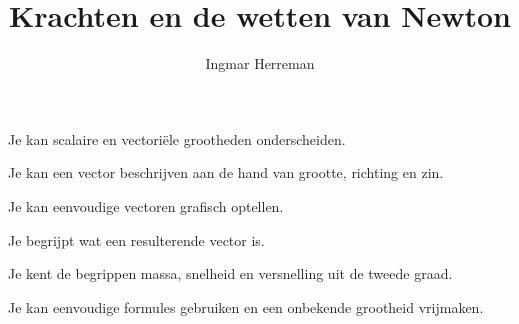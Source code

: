 \documentclass{ximera}
\title{Krachten en de wetten van Newton}
\author{Ingmar Herreman}
\begin{document}





\maketitle





\begin{voorkennis}

 \item Je kan scalaire en vectoriële grootheden onderscheiden.

 \item Je kan een vector beschrijven aan de hand van grootte, richting en zin.

 \item Je kan eenvoudige vectoren grafisch optellen.

 \item Je begrijpt wat een resulterende vector is.

 \item Je kent de begrippen massa, snelheid en versnelling uit de tweede graad.

 \item Je kan eenvoudige formules gebruiken en een onbekende grootheid vrijmaken.

\end{voorkennis}
\end{document}
